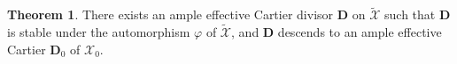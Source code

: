 \documentclass[11pt, reqno]{amsart}
\theoremstyle{plain}
\theoremstyle{definition}
\newtheorem{theorem}{Theorem}[section]
\newtheorem{lemma}[theorem]{Lemma}
\begin{document}


\begin{theorem}\label{descentampleCartier}
    There exists an ample effective Cartier divisor $\mathbf{D}$ on $\widetilde{\mathcal{X}}$ such that $\mathbf{D}$ is stable under the automorphism $\varphi$ of $\widetilde{\mathcal{X}}$, and $\mathbf{D}$ descends to an ample effective Cartier $\mathbf{D}_0$ of $\mathcal{X}_0$.
\end{theorem}
\end{document}
